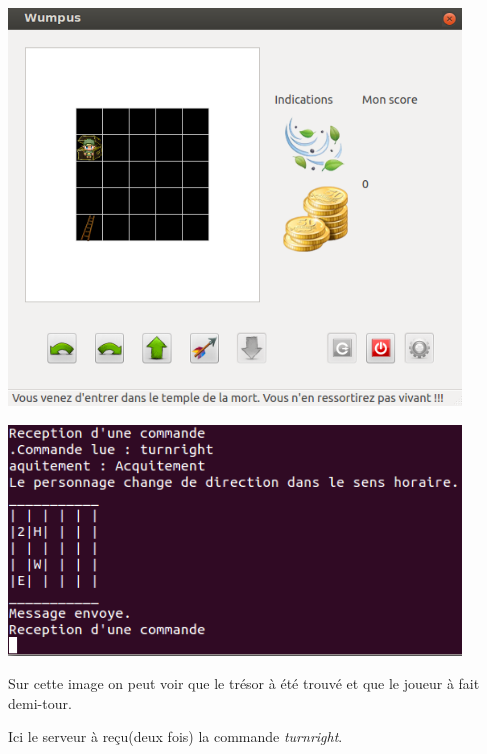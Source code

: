 \documentclass[a4paper,10pt]{article}
\begin{document}
		\begin{minipage}[t]{0.46\textwidth}
			\vspace{2pt}
			\centering
			\includegraphics[width=0.9\textwidth]{JeuxDEssais/Wumpus5.png}
		\end{minipage}
		\hfill
		\begin{minipage}[t]{0.46\textwidth}
			\vspace{30pt}
			\centering
			\includegraphics[width=0.9\textwidth]{JeuxDEssais/Serveur5.png}
		\end{minipage}

		\begin{minipage}[t]{0.46\textwidth}
			\vspace{2pt}
			Sur cette image on peut voir que le trésor à été trouvé et que le joueur à fait demi-tour.
		\end{minipage}
		\hfill
		\begin{minipage}[t]{0.46\textwidth}
			\vspace{2pt}
			Ici le serveur à reçu(deux fois) la commande \emph{turnright}.
		\end{minipage}\\
\end{document}
